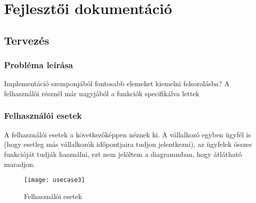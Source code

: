 \chapter{Fejlesztői dokumentáció} %
\label{ch:impl}

\section{Tervezés}

\subsection{Probléma leírása}

Implementáció szemponjából fontosabb elemeket kiemelni felsorolásba?
A felhasználói résznél már nagyjából a funkciók specifikálva lettek

\subsection{Felhasználói esetek}
A felhasználói esetek a következőképpen néznek ki. A vállalkozó egyben ügyfél is (hogy esetleg más vállalkozók időpontjaira tudjon jelentkezni), az ügyfelek összes funkcióját tudják használni, ezt nem jelöltem a diagrammban, hogy átlátható maradjon.

\begin{figure}[H]
	\texttt{[image: usecase3]}
	\caption{Felhasználói esetek}
	\label{fig:usecases}
\end{figure}

